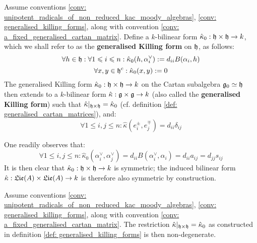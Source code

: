             \begin{definition} \label{def: generalised_killing_forms}
                Assume conventions \ref{conv: unipotent_radicals_of_non_reduced_kac_moody_algebras}, \ref{conv: generalised_killing_forms}, along with convention \ref{conv: a_fixed_generalised_cartan_matrix}. Define a $k$-bilinear form $\hat{\kappa}_0: \h \x \h \to k$, which we shall refer to as the \textbf{generalised Killing form} on $\mathfrak{h}$, as follows:
                    $$\forall h \in \mathfrak{h}: \forall 1 \leqslant i \leqslant n: \hat{\kappa}_0(h, \alpha_i^{\vee}) := d_{ii} B(\alpha_i, h)$$
                    $$\forall x, y \in \mathfrak{h}^c: \hat{\kappa}_0(x, y) := 0$$
                The generalised Killing form $\hat{\kappa}_0: \h \x \h \to k$ on the Cartan subalgebra $\mathfrak{g}_0 \simeq \mathfrak{h}$ then extends to a $k$-bilinear form $\hat{\kappa}: \g \x \g \to k$ (also called the \textbf{generalised Killing form}) such that $\hat{\kappa}|_{\h \x \h} = \hat{\kappa}_0$ (cf. definition \ref{def: generalised_cartan_matrices}), and:
                    $$\forall 1 \leq i, j \leq n: \hat{\kappa}(e_i^{\pm}, e_j^{\mp}) = d_{ii} \delta_{ij}$$
            \end{definition}
            \begin{remark} \label{remark: generalised_killing_forms_are_symmetric}
                One readily observes that:
                    $$\forall 1 \leq i, j \leq n: \hat{\kappa}_0(\alpha_i^{\vee}, \alpha_j^{\vee}) = d_{ii} B(\alpha_i^{\vee}, \alpha_i) = d_{ii} a_{ij} = d_{jj} s_{ij}$$
                It is then clear that $\hat{\kappa}_0: \h \x \h \to k$ is symmetric; the induced bilinear form $\hat{\kappa}: \frakLie(A) \x \frakLie(A) \to k$ is therefore also symmetric by construction.
            \end{remark}
            \begin{proposition} \label{prop: generalised_killing_forms_are_non_degenerate_on_cartan_subalgebras}
                Assume conventions \ref{conv: unipotent_radicals_of_non_reduced_kac_moody_algebras}, \ref{conv: generalised_killing_forms}, along with convention \ref{conv: a_fixed_generalised_cartan_matrix}. The restriction $\hat{\kappa}|_{\h \x \h} = \hat{\kappa}_0$ as constructed in definition \ref{def: generalised_killing_forms} is then non-degenerate.
            \end{proposition}
